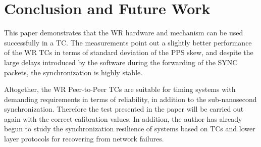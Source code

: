 \section{Conclusion and Future Work}
This paper demonstrates that the WR hardware and mechanism can be used 
successfully in a TC. The measurements point out a slightly better performance
of the WR TCs in terms of standard deviation of the PPS skew, 
and despite the large delays introduced by the software during the forwarding of 
the SYNC packets, the synchronization is highly stable. 

Altogether, the WR Peer-to-Peer TCs are suitable for timing systems with 
demanding requirements in terms of reliability, in addition to the
sub-nanosecond synchronization. Therefore the test presented in the paper will
be carried out again with the correct calibration values. In addition, 
the author has already begun to study the synchronization resilience of systems 
based on TCs and lower layer protocols for recovering from network failures. 

